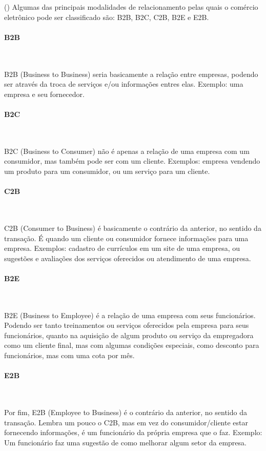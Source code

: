 (\cite{b2c-web}) Algumas das principais modalidades de relacionamento pelas quais o comércio eletrônico pode ser classificado são: B2B, B2C, C2B, B2E e E2B.

\paragraph{B2B}\mbox{}\\
\par
B2B (Business to Business) seria basicamente a relação entre empresas, podendo ser através da troca de serviços e/ou informações entres elas. Exemplo: uma empresa e seu fornecedor.


\paragraph{B2C}\mbox{}\\
\par
B2C (Business to Consumer) não é apenas a relação de uma empresa com um consumidor, mas também pode ser com um cliente. Exemplos: empresa vendendo um produto para um consumidor, ou um serviço para um cliente.

\paragraph{C2B}\mbox{}\\
\par
C2B (Consumer to Business) é basicamente o contrário da anterior, no sentido da transação. É quando um cliente ou consumidor fornece informações para uma empresa. Exemplos: cadastro de currículos em um site de uma empresa, ou sugestões e avaliações dos serviços oferecidos ou atendimento de uma empresa.

\paragraph{B2E}\mbox{}\\
\par
B2E (Business to Employee) é a relação de uma empresa com seus funcionários. Podendo ser tanto treinamentos ou serviços oferecidos pela empresa para seus funcionários, quanto na aquisição de algum produto ou serviço da empregadora como um cliente final, mas com algumas condições especiais, como desconto para funcionários, mas com uma cota por mês.

\paragraph{E2B}\mbox{}\\
\par
Por fim, E2B (Employee to Business) é o contrário da anterior, no sentido da transação. Lembra um pouco o C2B, mas em vez do consumidor/cliente estar fornecendo informações, é um funcionário da própria empresa que o faz. Exemplo: Um funcionário faz uma sugestão de como melhorar algum setor da empresa.

